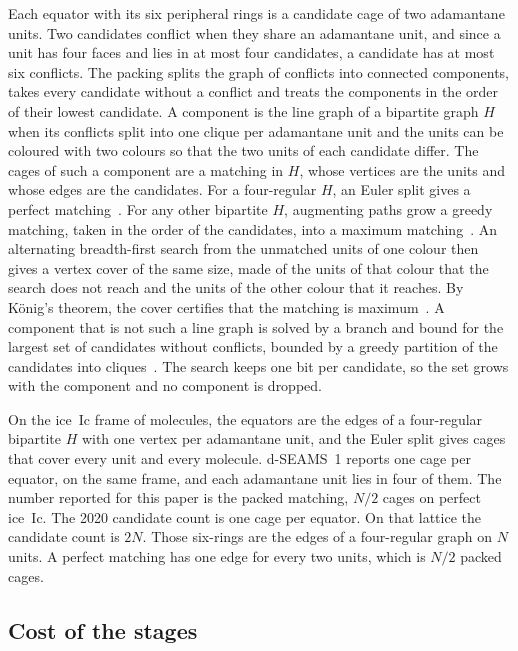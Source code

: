 \documentclass[preprint,12pt]{elsarticle}
\begin{document}
Each equator with its six peripheral rings is a candidate cage of two
adamantane units.
Two candidates conflict when they share an adamantane unit, and since a
unit has four faces and lies in at most four candidates, a candidate has
at most six conflicts.
The packing splits the graph of conflicts into connected components,
takes every candidate without a conflict and treats the components in
the order of their lowest candidate.
A component is the line graph of a bipartite graph $H$ when its
conflicts split into one clique per adamantane unit and the units can be
coloured with two colours so that the two units of each candidate
differ.
The cages of such a component are a matching in $H$, whose vertices are
the units and whose edges are the candidates.
For a four-regular $H$, an Euler split gives a perfect
matching~\cite{gabow1976euler}.
For any other bipartite $H$, augmenting paths grow a greedy matching,
taken in the order of the candidates, into a maximum
matching~\cite{kuhn1955hungarian}.
An alternating breadth-first search from the unmatched units of one
colour then gives a vertex cover of the same size, made of the units of
that colour that the search does not reach and the units of the other
colour that it reaches.
By K\"onig's theorem, the cover certifies that the matching is
maximum~\cite{konig1931graphs}.
A component that is not such a line graph is solved by a branch and
bound for the largest set of candidates without conflicts, bounded by a
greedy partition of the candidates into
cliques~\cite{tomita2003maxclique}.
The search keeps one bit per candidate, so the set grows with the
component and no component is dropped.

On the ice~Ic frame of  molecules, the
 equators are the edges of a
four-regular bipartite $H$ with one vertex per adamantane unit, and the
Euler split gives  cages that cover
every unit and every molecule.
d-SEAMS~1 reports one cage per equator, 
on the same frame, and each adamantane unit lies in four of them.
The number reported for this paper is the packed matching, $N/2$ cages
on perfect ice~Ic.
The 2020 candidate count is one cage per equator.
On that lattice the candidate count is $2N$.
Those six-rings are the edges of a four-regular graph on $N$ units.
A perfect matching has one edge for every two units, which is $N/2$
packed cages.

\subsection{Cost of the stages}
\label{sec:s-cost}
\end{document}
